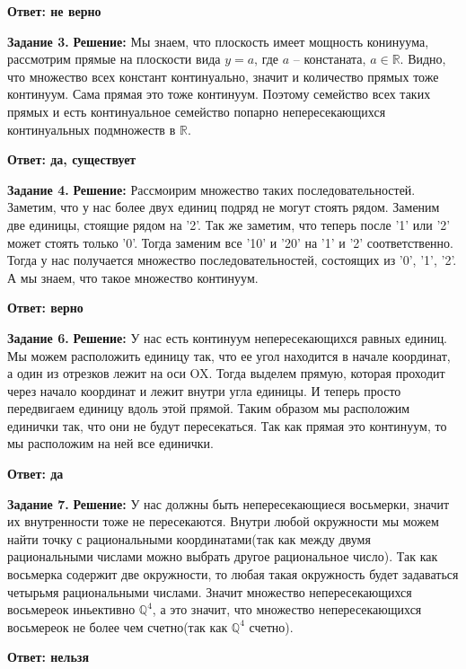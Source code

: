 \documentclass[12pt,a4paper]{scrartcl}
\begin{document}
	\begin{flushright}	
		\textbf{Ответ: не верно}
	\end{flushright}
	\noindent
	\textbf{Задание 3.} 
	\newline
	\textbf{Решение:} 
	\newline
	\indent
	Мы знаем, что плоскость имеет мощность конинуума, рассмотрим прямые на плоскости вида $y = a$, где $a$ -- констаната, $a \in \mathbb{R}$. Видно, что множество всех констант континуально, значит и количество прямых тоже континуум. Сама прямая это тоже континуум. Поэтому семейство всех таких прямых и есть континуальное семейство попарно непересекающихся континуальных подмножеств в $\mathbb{R}$.  
	\begin{flushright}
		\textbf{Ответ: да, существует}
	\end{flushright}
	\noindent
	\textbf{Задание 4.} 
	\newline
	\textbf{Решение:} 
	\newline 
	Рассмоирим множество таких последовательностей. Заметим, что у нас более двух единиц подряд не могут стоять рядом. Заменим две единицы, стоящие рядом на '2'. Так же заметим, что теперь после '1' или '2' может стоять только '0'. Тогда заменим все '10' и '20' на '1' и '2' соответственно. Тогда у нас получается множество последовательностей, состоящих из '0', '1', '2'. А мы знаем, что такое множество континуум.
	\begin{flushright}
	\textbf{Ответ: верно}
	\end{flushright}
	\newpage
	\noindent
	\textbf{Задание 6.}
	\newline
	\textbf{Решение:}
	\newline
	\indent
	У нас есть континуум непересекающихся равных единиц. Мы можем расположить единицу так, что ее угол находится в начале координат, а один из отрезков лежит на оси OX. Тогда выделем прямую, которая проходит через начало координат и лежит внутри угла единицы. И теперь просто передвигаем единицу вдоль этой прямой. Таким образом мы расположим единички так, что они не будут пересекаться. Так как прямая это континуум, то мы расположим на ней все единички. 
	\begin{flushright}
		\textbf{Ответ: да}
	\end{flushright}
	\textbf{Задание 7.} 
	\newline
	\textbf{Решение:}
	\newline
	\indent
	У нас должны быть непересекающиеся восьмерки, значит их внутренности тоже не пересекаются. Внутри любой окружности мы можем найти точку с рациональными координатами(так как между двумя рациональными числами можно выбрать другое рациональное число). Так как восьмерка содержит две окружности, то любая такая окружность будет задаваться четырьмя рациональными числами. Значит множество непересекающихся восьмереок иньективно $\mathbb{Q}^4$, а это значит, что множество непересекающихся восьмереок не более чем счетно(так как $\mathbb{Q}^4$ счетно).
	\begin{flushright}
		\textbf{Ответ: нельзя}
	\end{flushright}
\end{document}
